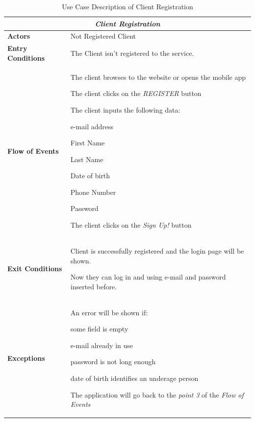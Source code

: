 \documentclass[a4paper]{article}
\begin{document}
\renewcommand{\arraystretch}{1.25}

\begin{table} [H]
\begin{center}
\begin{tabular}{ |m{}|m{}|  }
\hline
    \multicolumn{2}{|c|}{\textbf{\textit{Client Registration}}} \\
\hline \hline
    \textbf{Actors}
&   Not Registered Client
\\ \hline
    \textbf{Entry Conditions}
&   The Client isn't registered to the service.
\\ \hline
    \textbf{Flow of Events}
& 
    \begin{enumerate*}
    \item The client browses to the website or opens the mobile app
    \item The client clicks on the \emph{REGISTER} button
    \item The client inputs the following data:
        \begin{enumerate*}
        \item e-mail address
        \item First Name
        \item Last Name
        \item Date of birth
        \item Phone Number
        \item Password
        \end{enumerate*}
    \item The client clicks on the \emph{Sign Up!} button
    \end{enumerate*}
\\ \hline
    \textbf{Exit Conditions}
&   Client is successfully registered and the login page will be shown. 

    Now they can log in and using e-mail and password inserted before.
\\ \hline
    \textbf{Exceptions}
&   
    An error will be shown if:
    \begin{itemize*}
    \item some field is empty
    \item e-mail already in use
    \item password is not long enough
    \item date of birth identifies an underage person
    \end{itemize*}
    The application will go back to the \emph{point 3} of the \emph{Flow of Events}
\\ \hline
\end{tabular}
\end{center}
\caption{Use Case Description of Client Registration}
\label{table:clientregistration}
\end{table}
\end{document}
